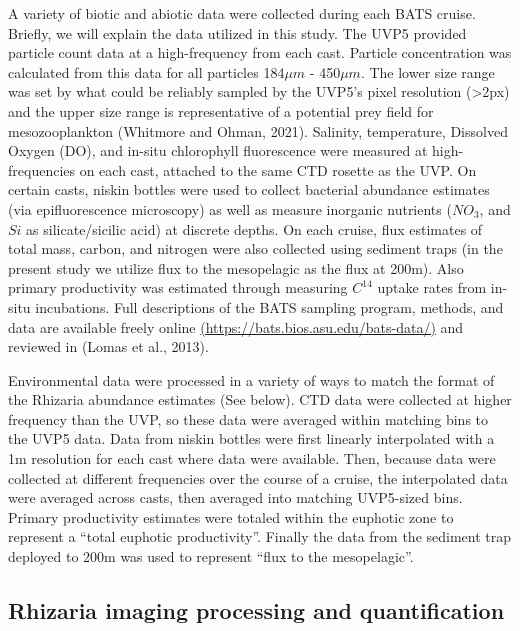 \documentclass[
]{article}
\begin{document}
A variety of biotic and abiotic data were collected during each BATS
cruise. Briefly, we will explain the data utilized in this study. The
UVP5 provided particle count data at a high-frequency from each cast.
Particle concentration was calculated from this data for all particles
184\(\mu m\) - 450\(\mu m\). The lower size range was set by what could
be reliably sampled by the UVP5's pixel resolution (\textgreater2px) and
the upper size range is representative of a potential prey field for
mesozooplankton (Whitmore and Ohman, 2021). Salinity, temperature,
Dissolved Oxygen (DO), and in-situ chlorophyll fluorescence were
measured at high-frequencies on each cast, attached to the same CTD
rosette as the UVP. On certain casts, niskin bottles were used to
collect bacterial abundance estimates (via epifluorescence microscopy)
as well as measure inorganic nutrients (\(NO_3\), and \(Si\) as
silicate/sicilic acid) at discrete depths. On each cruise, flux
estimates of total mass, carbon, and nitrogen were also collected using
sediment traps (in the present study we utilize flux to the mesopelagic
as the flux at 200m). Also primary productivity was estimated through
measuring \(C^{14}\) uptake rates from in-situ incubations. Full
descriptions of the BATS sampling program, methods, and data are
available freely online
\href{https://bats.bios.asu.edu/bats-data/}{(https://bats.bios.asu.edu/bats-data/)}
and reviewed in (Lomas et al., 2013).

Environmental data were processed in a variety of ways to match the
format of the Rhizaria abundance estimates (See below). CTD data were
collected at higher frequency than the UVP, so these data were averaged
within matching bins to the UVP5 data. Data from niskin bottles were
first linearly interpolated with a 1m resolution for each cast where
data were available. Then, because data were collected at different
frequencies over the course of a cruise, the interpolated data were
averaged across casts, then averaged into matching UVP5-sized bins.
Primary productivity estimates were totaled within the euphotic zone to
represent a ``total euphotic productivity''. Finally the data from the
sediment trap deployed to 200m was used to represent ``flux to the
mesopelagic''.

\hypertarget{rhizaria-imaging-processing-and-quantification}{%
\subsection{Rhizaria imaging processing and
quantification}\label{rhizaria-imaging-processing-and-quantification}}
\end{document}
